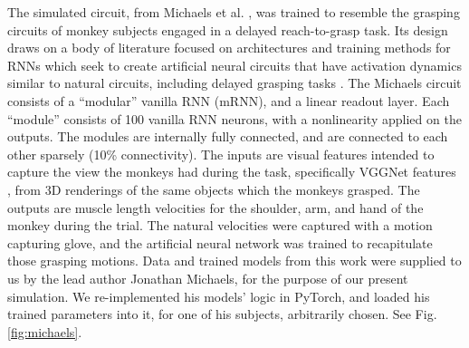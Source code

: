 \documentclass[12pt]{iopart}
\begin{document}
The simulated circuit, from Michaels et al. \cite{michaels.mrnn}, was trained
to resemble the grasping circuits of monkey subjects engaged in a delayed reach-to-grasp task.
Its design draws on a body of literature focused on architectures and training methods for RNNs which
seek to create artificial neural circuits that have activation dynamics similar to natural circuits,
including delayed grasping tasks \cite{susillo.mrnn}. The Michaels circuit consists of a
``modular'' vanilla RNN (mRNN), and a linear readout layer. Each ``module'' consists of 100 vanilla
RNN neurons, with a nonlinearity applied on the outputs. The modules are internally fully connected,
and are connected to each other sparsely (10\% connectivity). The inputs are visual features
intended to capture the view the monkeys had during the task, specifically VGGNet features \cite{simonyan.vgg},
from 3D renderings of the same objects which the monkeys grasped. The outputs are muscle length
velocities for the shoulder, arm, and hand of the monkey during the trial. The natural
velocities were captured with a motion capturing glove, and the artificial neural network
was trained to recapitulate those grasping motions. Data and trained models from this work
were supplied to us by the lead author Jonathan Michaels, for the purpose of our present
simulation. We re-implemented his models' logic in PyTorch, and loaded his trained parameters
into it, for one of his subjects, arbitrarily chosen. See Fig. \ref{fig:michaels}.
\end{document}
